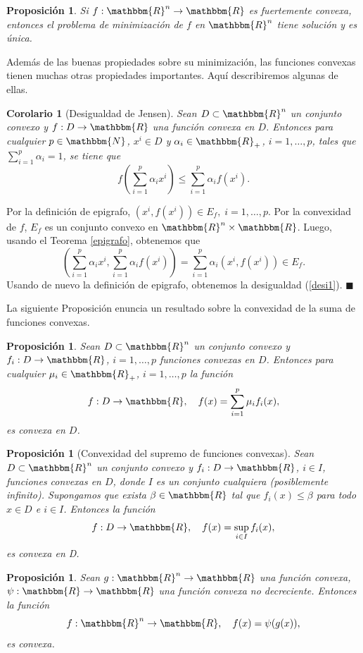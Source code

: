 \documentclass[a4paper,12pt]{report}
\newcommand{\RR}{\mathbbm{R}}
\newcommand{\NN}{\mathbbm{N}}
\newcommand{\Rn}{\RR^n}
\newcommand{\arr}{\rightarrow}
\newtheorem{cor}[teo]{Corolario}
\newtheorem{prop}[teo]{Proposici\'on}
\newenvironment{dem}{\vspace*{-0.1cm}{\it Demostraci\'on:}}{\hfill
$\blacksquare$\\}
\begin{document}
\begin{prop}\label{prop:fuert_conv}
 Si $f:\Rn\arr\RR$ es fuertemente convexa, entonces el problema de minimizaci\'on de $f$ en $\Rn$ tiene soluci\'on y es \'unica.
\end{prop}

Adem\'as de las buenas propiedades sobre su minimizaci\'on, las funciones convexas tienen muchas otras propiedades importantes. Aqu\'i describiremos algunas de ellas.

\begin{cor}[Desigualdad de Jensen]
Sean $D\subset\Rn$ un conjunto convexo y $f:D\arr\RR$ una funci\'on convexa en $D$.
Entonces para cualquier $p\in\NN$, $x^i\in D$ y $\alpha_i\in\RR_+$, $i=1,\ldots,p$, tales que $\sum_{i=1}^{p}\alpha_i=1$, se tiene que
\begin{equation}\label{desi1}
f\left(\sum_{i=1}^{p}\alpha_i x^i\right)\leq\sum_{i=1}^{p}\alpha_i f(x^i).
\end{equation} 
\end{cor}
\begin{dem}
Por la definici\'on de epigrafo, $(x^i,f(x^i))\in E_f ,\;i=1,\ldots,p$. Por la convexidad de $f$, $E_f$ es un conjunto convexo en $\Rn\times\RR$. Luego, usando el Teorema \ref{epigrafo}, obtenemos que
$$\left(\sum_{i=1}^{p}\alpha_i x^i,\sum_{i=1}^{p}\alpha_i f(x^i)\right)=\sum_{i=1}^{p}\alpha_i(x^i,f(x^i))\in E_f.$$
Usando de nuevo la definici\'on de epigrafo, obtenemos la desigualdad (\ref{desi1}).
\end{dem}

La siguiente Proposici\'on enuncia un resultado sobre la convexidad de la suma de funciones convexas.

\begin{prop}\label{sumfunconv}%
Sean $D\subset\Rn$ un conjunto convexo y $f_i:D\arr\RR$, $i=1,\ldots,p$ funciones convexas en $D$.
Entonces para cualquier $\mu_i\in\RR_+$, $i=1,\ldots,p$ la funci\'on 
$$f:D\arr\RR,\quad f(x)=\sum_{i=1}^p\mu_i f_i(x),$$
es convexa en $D$.
\end{prop}
\begin{prop}[Convexidad del supremo de funciones convexas]
Sean \\ $D\subset\Rn$ un conjunto convexo y $f_i:D\arr\RR$, $i\in I$, funciones convexas en $D$, donde $I$ es un conjunto cualquiera (posiblemente infinito). Supongamos que exista $\beta\in\RR$ tal que $f_i(x)\leq\beta$ para todo $x\in D$ e $i\in I$.
Entonces la funci\'on
$$f:D\arr\RR,\quad f(x)=\sup_{i\in I}f_i(x),$$
es convexa en D.
\end{prop}
\begin{prop}
Sean $g:\Rn\arr\RR$ una funci\'on convexa, $\psi:\RR\arr\RR$ una funci\'on convexa no decreciente.
Entonces la funci\'on
$$f:\Rn\arr\RR,\quad f(x)=\psi(g(x)),$$
es convexa.
\end{prop}
\end{document}
